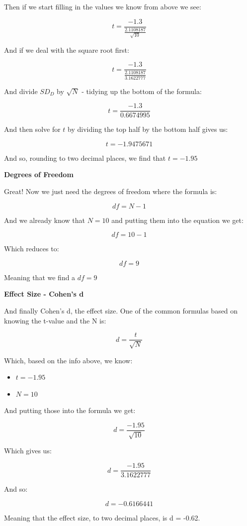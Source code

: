 \documentclass[
  oneside]{book}
\providecommand{\tightlist}{%
  \setlength{\itemsep}{0pt}\setlength{\parskip}{0pt}}
\begin{document}
Then if we start filling in the values we know from above we see:

\[t = \frac{-1.3}{\frac{2.1108187}{\sqrt{10}}} \]

And if we deal with the square root first:

\[t = \frac{-1.3}{\frac{2.1108187}{3.1622777}} \]

And divide \(SD_{D}\) by \(\sqrt{N}\) - tidying up the bottom of the formula:

\[t = \frac{-1.3}{0.6674995} \]

And then solve for \(t\) by dividing the top half by the bottom half gives us:

\[t = -1.9475671 \]

And so, rounding to two decimal places, we find that \(t = -1.95\)

\textbf{Degrees of Freedom}

Great! Now we just need the degrees of freedom where the formula is:

\[df = N - 1\]

And we already know that \(N= 10\) and putting them into the equation we get:

\[df = 10 - 1\]

Which reduces to:

\[df = 9\]

Meaning that we find a \(df = 9\)

\textbf{Effect Size - Cohen's d}

And finally Cohen's d, the effect size. One of the common formulas based on knowing the t-value and the N is:

\[d = \frac{t}{\sqrt{N}}\]

Which, based on the info above, we know:

\begin{itemize}
\tightlist
\item
  \(t = -1.95\)
\item
  \(N = 10\)
\end{itemize}

And putting those into the formula we get:

\[d = \frac{-1.95}{\sqrt{10}}\]

Which gives us:

\[d = \frac{-1.95}{3.1622777}\]

And so:

\[d = -0.6166441\]

Meaning that the effect size, to two decimal places, is d = -0.62.
\end{document}
